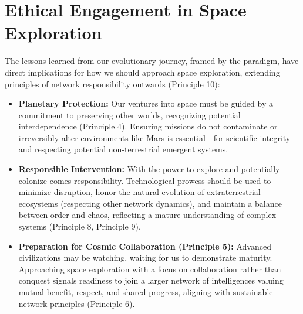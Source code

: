 \documentclass[12pt,openany]{book}
\begin{document}
\section{Ethical Engagement in Space Exploration}
The lessons learned from our evolutionary journey, framed by the paradigm, have direct implications for how we should approach space exploration, extending principles of network responsibility outwards (Principle 10):
\begin{itemize}
    \item \textbf{Planetary Protection:} Our ventures into space must be guided by a commitment to preserving other worlds, recognizing potential interdependence (Principle 4). Ensuring missions do not contaminate or irreversibly alter environments like Mars is essential—for scientific integrity and respecting potential non-terrestrial emergent systems.
    \item \textbf{Responsible Intervention:} With the power to explore and potentially colonize comes responsibility. Technological prowess should be used to minimize disruption, honor the natural evolution of extraterrestrial ecosystems (respecting other network dynamics), and maintain a balance between order and chaos, reflecting a mature understanding of complex systems (Principle 8, Principle 9).
    \item \textbf{Preparation for Cosmic Collaboration (Principle 5):} Advanced civilizations may be watching, waiting for us to demonstrate maturity. Approaching space exploration with a focus on collaboration rather than conquest signals readiness to join a larger network of intelligences valuing mutual benefit, respect, and shared progress, aligning with sustainable network principles (Principle 6).
\end{itemize} %
\end{document}
